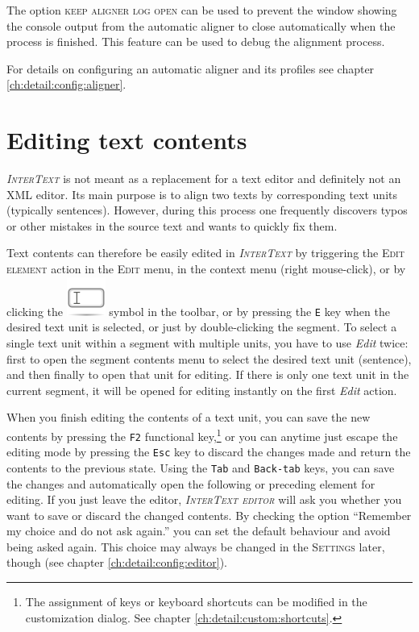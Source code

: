 \documentclass[a4paper,10pt,oneside]{book}
\newcommand{\IT}{\textit{\textsc{InterText}}\xspace}
\newcommand{\ITeditor}{\textit{\textsc{InterText editor}}\xspace}
\newcommand{\keys}[1]{\texttt{#1}}
\newcommand{\menu}[1]{\textsc{#1}}
\begin{document}
The option \menu{keep aligner log open} can be used to prevent the window showing the console output from the automatic aligner to close automatically when the process is finished. This feature can be used to debug the alignment process.

For details on configuring an automatic aligner and its profiles see chapter \ref{ch:detail:config:aligner}.


\section{Editing text contents}\label{ch:howto:edit_text}

\IT is not meant as a replacement for a text editor and definitely not an XML editor. Its main purpose is to align two texts by corresponding text units (typically sentences). However, during this process one frequently discovers typos or other mistakes in the source text and wants to quickly fix them.

Text contents can therefore be easily edited in \IT by triggering the \menu{Edit element} action in the \menu{Edit} menu, in the context menu (right mouse-click), or by clicking the \includegraphics[height=2ex]{../images/48/edit-rename.png} symbol in the toolbar, or by pressing the \keys{E} key when the desired text unit is selected, or just by double-clicking the segment. To select a single text unit within a segment with multiple units, you have to use \emph{Edit} twice: first to open the segment contents menu to select the desired text unit (sentence), and then finally to open that unit for editing. If there is only one text unit in the current segment, it will be opened for editing instantly on the first \emph{Edit} action.

When you finish editing the contents of a text unit, you can save the new contents by pressing the \keys{F2} functional key,\footnote{The assignment of keys or keyboard shortcuts can be modified in the customization dialog. See chapter \ref{ch:detail:custom:shortcuts}.} or you can anytime just escape the editing mode by pressing the \keys{Esc} key to discard the changes made and return the contents to the previous state. Using the \keys{Tab} and \keys{Back-tab} keys, you can save the changes and automatically open the following or preceding element for editing. If you just leave the editor, \ITeditor will ask you whether you want to save or discard the changed contents. By checking the option ``Remember my choice and do not ask again.'' you can set the default behaviour and avoid being asked again. This choice may always be changed in the \menu{Settings} later, though (see chapter \ref{ch:detail:config:editor}).
\end{document}
